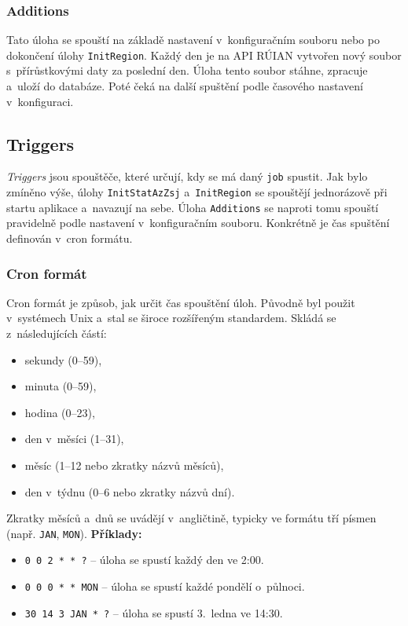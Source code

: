 \subsubsection*{Additions}
Tato úloha se spouští na základě nastavení v~konfiguračním souboru nebo po dokončení úlohy \texttt{InitRegion}.  
Každý den je na API RÚIAN vytvořen nový soubor s~přírůstkovými daty za poslední den.  
Úloha tento soubor stáhne, zpracuje a~uloží do databáze.  
Poté čeká na další spuštění podle časového nastavení v~konfiguraci.

\subsection{Triggers}
\textit{Triggers} jsou spouštěče, které určují, kdy se má daný \texttt{job} spustit.  
Jak bylo zmíněno výše, úlohy \texttt{InitStatAzZsj} a~\texttt{InitRegion} se spouštějí jednorázově při startu aplikace a~navazují na sebe.  
Úloha \texttt{Additions} se naproti tomu spouští pravidelně podle nastavení v~konfiguračním souboru.  
Konkrétně je čas spuštění definován v~cron formátu.

\subsubsection*{Cron formát}
Cron formát je způsob, jak určit čas spouštění úloh.  
Původně byl použit v~systémech Unix a~stal se široce rozšířeným standardem.  
Skládá se z~následujících částí:
\begin{itemize}
    \item sekundy (0--59),
    \item minuta (0--59),
    \item hodina (0--23),
    \item den v~měsíci (1--31),
    \item měsíc (1--12 nebo zkratky názvů měsíců),
    \item den v~týdnu (0--6 nebo zkratky názvů dní).
\end{itemize}
Zkratky měsíců a~dnů se uvádějí v~angličtině, typicky ve formátu tří písmen (např. \texttt{JAN}, \texttt{MON}).
\textbf{Příklady:}
\begin{itemize}
    \item \texttt{0 0 2 * * ?} -- úloha se spustí každý den ve 2:00.
    \item \texttt{0 0 0 * * MON} -- úloha se spustí každé pondělí o~půlnoci.
    \item \texttt{30 14 3 JAN * ?} -- úloha se spustí 3.~ledna ve 14:30.
\end{itemize}

